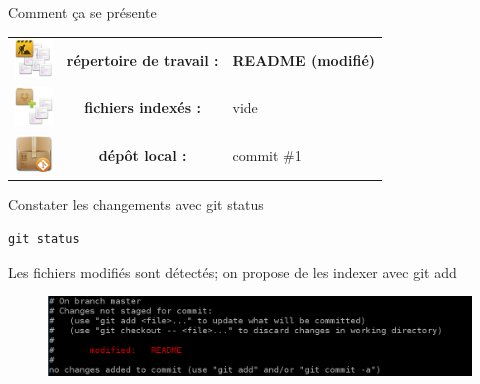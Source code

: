 \documentclass{beamer}
\begin{document}
\begin{frame}{Comment ça se présente}
	\begin{center}
		\begin{tabular}{l c l}
		\includegraphics[width=1cm]{img/working_dir} & \textbf{répertoire de travail :} & \textbf{README (modifié)} \\
		\includegraphics[width=1cm]{img/stash} & \textbf{fichiers indexés :} & vide\\
		\includegraphics[width=1cm]{img/git_repo} & \textbf{dépôt local :} & commit \#1\\ 
		\end{tabular} 
	\end{center}
\end{frame}

\begin{frame}[fragile]{Constater les changements avec git status}
	\begin{lstlisting}[frame=single]
		git status
	\end{lstlisting}
	
	Les fichiers modifiés sont détectés; on propose de les indexer avec git add	
	
	\begin{figure}
		\centering
		\includegraphics[width=11.5cm]{img/shot3}
	\end{figure}
\end{frame}
\end{document}

